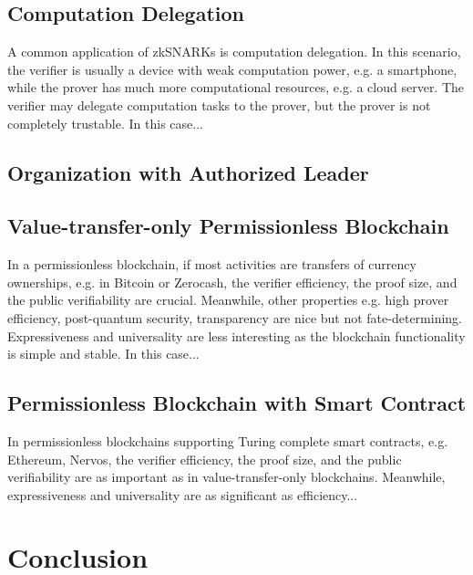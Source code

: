 \documentclass[acmtog]{acmart}
\begin{document}
\subsection{Computation Delegation}

A common application of zkSNARKs is computation delegation.
In this scenario, the verifier is usually a device with weak computation power, e.g. a smartphone, while the prover has much more computational resources, e.g. a cloud server.
The verifier may delegate computation tasks to the prover, but the prover is not completely trustable.
In this case...

\subsection{Organization with Authorized Leader}

\subsection{Value-transfer-only Permissionless Blockchain}

In a permissionless blockchain, if most activities are transfers of currency ownerships, e.g. in Bitcoin or Zerocash, the verifier efficiency, the proof size, and the public verifiability are crucial.
Meanwhile, other properties e.g. high prover efficiency, post-quantum security, transparency are nice but not fate-determining.
Expressiveness and universality are less interesting as the blockchain functionality is simple and stable.
In this case...

\subsection{Permissionless Blockchain with Smart Contract}

In permissionless blockchains supporting Turing complete smart contracts, e.g. Ethereum, Nervos, the verifier efficiency, the proof size, and the public verifiability are as important as in value-transfer-only blockchains.
Meanwhile, expressiveness and universality are as significant as efficiency...


\section{Conclusion}
\end{document}
